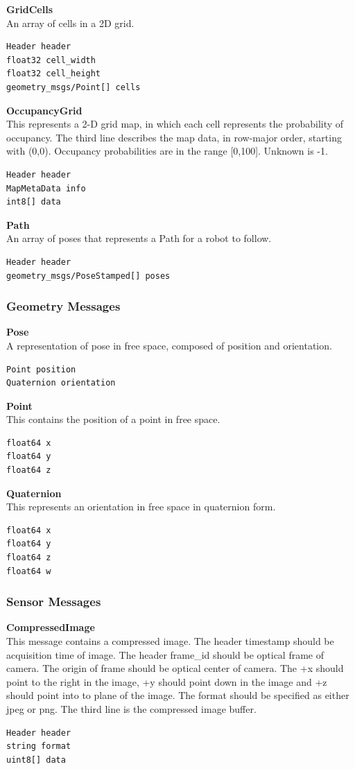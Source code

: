 \documentclass[twoside]{article}
\begin{document}
\textbf{GridCells} \\
An array of cells in a 2D grid.
\begin{verbatim}
Header header
float32 cell_width
float32 cell_height
geometry_msgs/Point[] cells
\end{verbatim}

\textbf{OccupancyGrid} \\
This represents a 2-D grid map, in which each cell represents the probability of occupancy. The third line describes the map data, in row-major order, starting with (0,0). Occupancy probabilities are in the range [0,100]. Unknown is -1.
\begin{verbatim}
Header header 
MapMetaData info
int8[] data
\end{verbatim}

\textbf{Path} \\
An array of poses that represents a Path for a robot to follow.
\begin{verbatim}
Header header
geometry_msgs/PoseStamped[] poses
\end{verbatim}

\subsubsection{Geometry Messages}

\textbf{Pose} \\
A representation of pose in free space, composed of position and orientation.
\begin{verbatim}
Point position
Quaternion orientation
\end{verbatim}

\textbf{Point} \\
This contains the position of a point in free space.
\begin{verbatim}
float64 x
float64 y
float64 z
\end{verbatim}

\textbf{Quaternion} \\
This represents an orientation in free space in quaternion form.
\begin{verbatim}
float64 x
float64 y
float64 z
float64 w
\end{verbatim}

\subsubsection{Sensor Messages}

\textbf{CompressedImage} \\
This message contains a compressed image. The header timestamp should be acquisition time of image. The header frame\_id should be optical frame of camera. The origin of frame should be optical center of camera. The +x should point to the right in the image, +y should point down in the image and +z should point into to plane of the image. The format should be specified as either jpeg or png. The third line is the compressed image buffer.
\begin{verbatim}
Header header
string format
uint8[] data
\end{verbatim}
\end{document}
